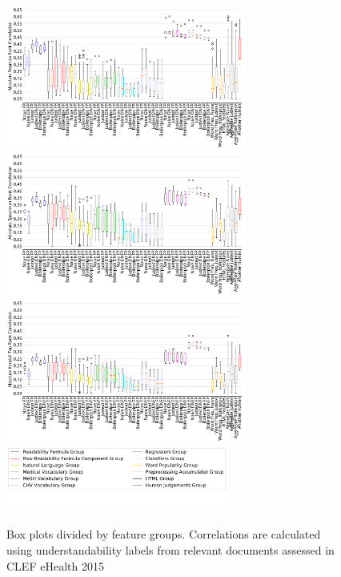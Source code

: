 \documentclass[runningheads,a4paper]{llncs}
\begin{document}
\begin{figure}[th!]
   \centering
   \includegraphics[width=0.70\textwidth]{graphics/box_pearson15_raw_values}
   \includegraphics[width=0.70\textwidth]{graphics/box_spearman15_raw_values}
   \includegraphics[width=0.70\textwidth]{graphics/box_kendalltau15_raw_values}
    \includegraphics[width=0.65\textwidth]{graphics/legendCorr}
    \vspace{-1.cm}
    \caption{Box plots divided by feature groups. Correlations are calculated using understandability labels from relevant documents assessed in CLEF eHealth 2015}
   \label{fig:boxplot_corr_docs_2015}
\end{figure}
\end{document}
